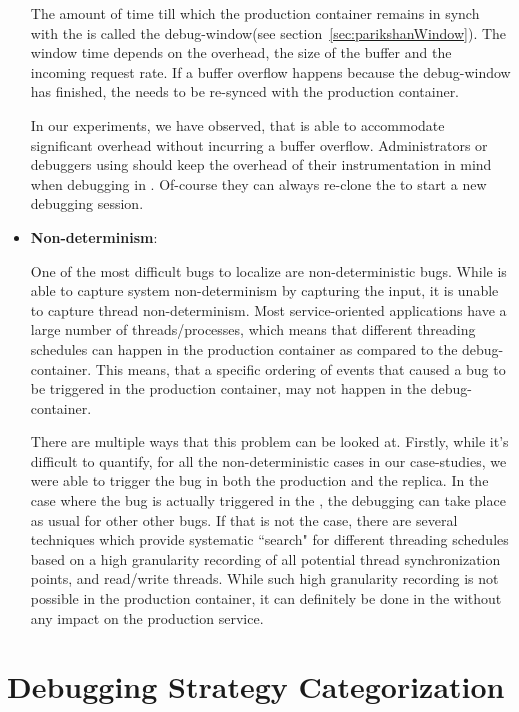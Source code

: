\begin{itemize}
	The amount of time till which the production container remains in synch with the \debugcontainer is called the debug-window(see section~\ref{sec:parikshanWindow}). The window time depends on the overhead, the size of the buffer and the incoming request rate. If a buffer overflow happens because the debug-window has finished, the \debugcontainer needs to be re-synced with the production container.
	
	In our experiments, we have observed, that \parikshan is able to accommodate significant overhead without incurring a buffer overflow.	
	Administrators or debuggers using \parikshan should keep the overhead of their instrumentation in mind when debugging in \parikshan. Of-course they can always re-clone the \productioncontainer to start a new debugging session.
	
	\item \textbf{Non-determinism}:
	
	One of the most difficult bugs to localize are non-deterministic bugs. While \parikshan is able to capture system non-determinism by capturing the input, it is unable to capture thread non-determinism. Most service-oriented applications have a large number of threads/processes, which means that different threading schedules can happen in the production container as compared to the debug-container.
	This means, that a specific ordering of events that caused a bug to be triggered in the production container, may not happen in the debug-container.
	
	There are multiple ways that this problem can be looked at. Firstly, while it's difficult to quantify, for all the non-deterministic cases in our case-studies, we were able to trigger the bug in both the production and the replica. 
	In the case where the bug is actually triggered in the \debugcontainer, the debugging can take place as usual for other other bugs.
	If that is not the case, there are several techniques which provide systematic ``search" for different threading schedules based on a high granularity recording of all potential thread synchronization points, and read/write threads. While such high granularity recording is not possible in the production container, it can definitely be done in the \debugcontainer without any impact on the production service.
	
\end{itemize}

\section{Debugging Strategy Categorization}
\label{sec:activeDebuggingScenarios}

